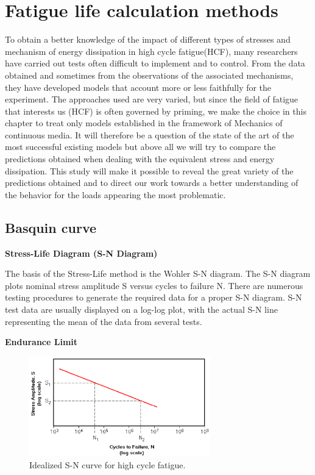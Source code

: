 \chapter{Fatigue life calculation methods}\label{chp:2}
\minitoc

To obtain a better knowledge of the impact of different types of stresses and mechanism of energy dissipation in high cycle fatigue(HCF), many researchers have carried out tests often difficult to implement and to control. From the data obtained and sometimes from the observations of the associated mechanisms, they have developed models that account more or less faithfully for the experiment. The approaches used are very varied, but since the field of fatigue that interests us (HCF) is often governed by priming, we make the choice in this chapter to treat only models established in the framework of Mechanics of continuous media. It will therefore be a question of the state of the art of the most successful existing models but above all we will try to compare the predictions obtained when dealing with the equivalent stress and energy dissipation. This study will make it possible to reveal the great variety of the predictions obtained and to direct our work towards a better understanding of the behavior for the loads appearing the most problematic.



\section{Basquin curve}

\vspace{6pt}
\textbf{Stress-Life Diagram (S-N Diagram)}

The basis of the Stress-Life method is the Wohler S-N diagram. The S-N diagram plots nominal stress amplitude S versus cycles to
failure N. There are numerous testing procedures to generate the required data for a proper
S-N diagram. S-N test data are usually displayed on a log-log plot, with the actual S-N line
representing the mean of the data from several tests.

\textbf{Endurance Limit}

\begin{figure}[h!]
	\centering
	\includegraphics[width=0.7\textwidth]{figures//basquin.png} 
	\caption{Idealized S-N curve for high cycle fatigue.}
	\label{fig.basquin}
\end{figure}

